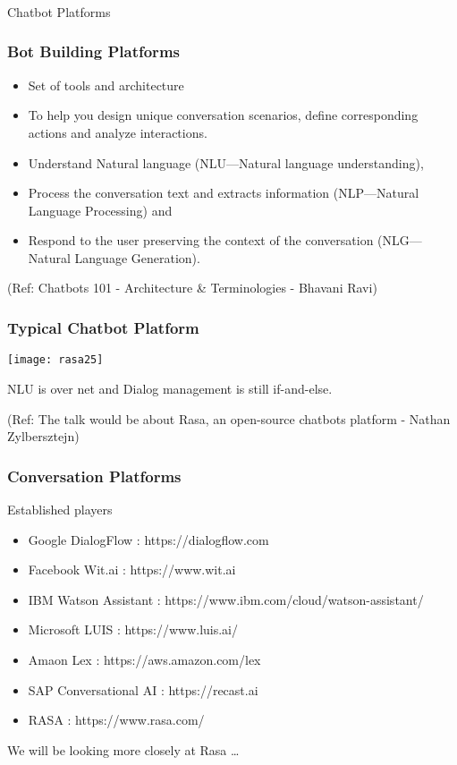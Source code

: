 \begin{frame}[fragile]\frametitle{}
\begin{center}
{\Large Chatbot Platforms}
\end{center}
\end{frame}

 \begin{frame}[fragile]\frametitle{Bot Building Platforms}
\begin{itemize}
\item Set of tools and architecture
\item To help you design unique conversation scenarios, define corresponding actions and analyze interactions.
\item Understand Natural language (NLU—Natural language understanding), 
\item Process the conversation text and extracts information (NLP—Natural Language Processing) and \item Respond to the user preserving the context of the conversation (NLG—Natural Language Generation).
\end{itemize}

{\tiny (Ref: Chatbots 101 - Architecture \& Terminologies -  Bhavani Ravi)}

\end{frame}

\begin{frame}[fragile]\frametitle{Typical Chatbot Platform}


\begin{center}
\texttt{[image: rasa25]}
\end{center}

NLU is over net and Dialog management is still if-and-else.

{\tiny (Ref: The talk would be about Rasa, an open-source chatbots platform - Nathan Zylbersztejn)}

\end{frame}


 \begin{frame}[fragile]\frametitle{Conversation Platforms}
 Established players
\begin{itemize}
\item Google DialogFlow : https://dialogflow.com
\item Facebook Wit.ai : https://www.wit.ai
\item IBM Watson Assistant : https://www.ibm.com/cloud/watson-assistant/
\item Microsoft LUIS : https://www.luis.ai/
\item Amaon Lex : https://aws.amazon.com/lex
\item SAP Conversational AI : https://recast.ai
\item RASA : https://www.rasa.com/
\end{itemize}

We will be looking more closely at Rasa \ldots
\end{frame}

